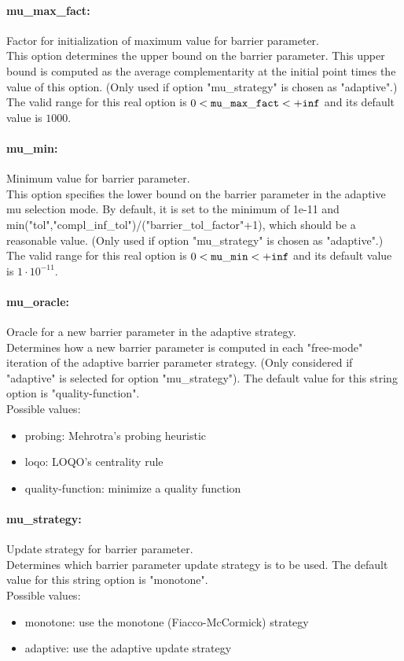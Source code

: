\paragraph{mu\_max\_fact:}\label{opt:mu_max_fact} Factor for initialization of maximum value for barrier parameter. \\
 This option determines the upper bound on the barrier parameter.  This upper bound is computed as the average complementarity at the initial point times the value of this option. (Only used if option "mu\_strategy" is chosen as "adaptive".) The valid range for this real option is 
$0 <  {\tt mu\_max\_fact } <  {\tt +inf}$
and its default value is $1000$.


\paragraph{mu\_min:}\label{opt:mu_min} Minimum value for barrier parameter. \\
 This option specifies the lower bound on the barrier parameter in the adaptive mu selection mode. By default, it is set to the minimum of 1e-11 and min("tol","compl\_inf\_tol")/("barrier\_tol\_factor"+1), which should be a reasonable value. (Only used if option "mu\_strategy" is chosen as "adaptive".) The valid range for this real option is 
$0 <  {\tt mu\_min } <  {\tt +inf}$
and its default value is $1 \cdot 10^{-11}$.


\paragraph{mu\_oracle:}\label{opt:mu_oracle} Oracle for a new barrier parameter in the adaptive strategy. \\
 Determines how a new barrier parameter is computed in each "free-mode" iteration of the adaptive barrier parameter strategy. (Only considered if "adaptive" is selected for option "mu\_strategy"). The default value for this string option is "quality-function".
\\ 
Possible values:
\begin{itemize}
   \item probing: Mehrotra's probing heuristic
   \item loqo: LOQO's centrality rule
   \item quality-function: minimize a quality function
\end{itemize}

\paragraph{mu\_strategy:}\label{opt:mu_strategy} Update strategy for barrier parameter. \\
 Determines which barrier parameter update strategy is to be used. The default value for this string option is "monotone".
\\ 
Possible values:
\begin{itemize}
   \item monotone: use the monotone (Fiacco-McCormick) strategy
   \item adaptive: use the adaptive update strategy
\end{itemize}

